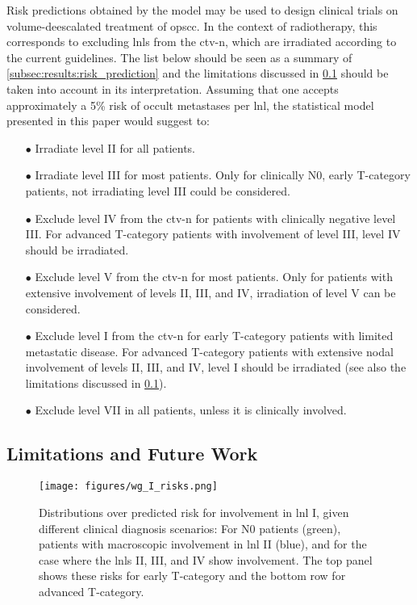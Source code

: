 \documentclass[twocolumn]{article}
\begin{document}
Risk predictions obtained by the model may be used to design clinical trials on volume-deescalated treatment of \gls{opscc}. In the context of radiotherapy, this corresponds to excluding \glspl{lnl} from the \gls{ctv-n}, which are irradiated according to the current guidelines. The list below should be seen as a summary of \cref{subsec:results:risk_prediction} and the limitations discussed in \cref{subsec:disc:limitation} should be taken into account in its interpretation. Assuming that one accepts approximately a 5\% risk of occult metastases per \gls{lnl}, the statistical model presented in this paper would suggest to:
\begin{itemize}
    \item[$\bullet$] Irradiate level II for all patients.
    \item[$\bullet$] Irradiate level III for most patients. Only for clinically N0, early T-category patients, not irradiating level III could be considered. 
    \item[$\bullet$] Exclude level IV from the \gls{ctv-n} for patients with clinically negative level III. For advanced T-category patients with involvement of level III, level IV should be irradiated.
    \item[$\bullet$] Exclude level V from the \gls{ctv-n} for most patients. Only for patients with extensive involvement of levels II, III, and IV, irradiation of level V can be considered.
    \item[$\bullet$] Exclude level I from the \gls{ctv-n} for early T-category patients with limited metastatic disease. For advanced T-category patients with extensive nodal involvement of levels II, III, and IV, level I should be irradiated (see also the limitations discussed in \cref{subsec:disc:limitation}).
    \item[$\bullet$] Exclude level VII in all patients, unless it is clinically involved.
\end{itemize}


\subsection{Limitations and Future Work}
\label{subsec:disc:limitation}

\begin{figure}[!hb]
    \begin{centering}
        \texttt{[image: figures/wg\_I\_risks.png]}
        \caption{Distributions over predicted risk for involvement in \gls{lnl} I, given different clinical diagnosis scenarios: For N0 patients (green), patients with macroscopic involvement in \gls{lnl} II (blue), and for the case where the \glspl{lnl} II, III, and IV show involvement. The top panel shows these risks for early T-category and the bottom row for advanced T-category. \label{fig:wg_I_risks}}
    \end{centering}
\end{figure}
\end{document}
